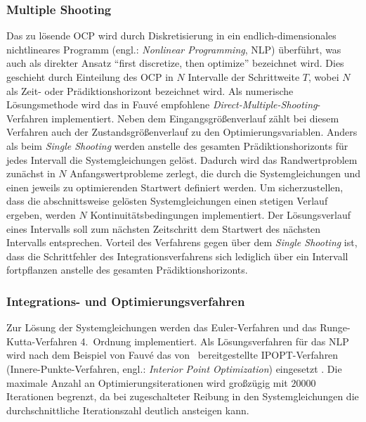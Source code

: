\subsubsection{Multiple Shooting}
Das zu lösende OCP wird durch Diskretisierung in ein endlich-dimensionales nichtlineares Programm (engl.: \textit{Nonlinear Programming}, NLP) überführt, was auch als direkter Ansatz \bzw "`first discretize, then optimize"' bezeichnet wird. Dies geschieht durch Einteilung des OCP in $N$ Intervalle der Schrittweite $T$, wobei $N$ als Zeit- oder Prädiktionshorizont bezeichnet wird. Als numerische Lösungsmethode wird das in Fauvé \cite{fauve} empfohlene \textit{Direct-Multiple-Shooting}-Verfahren implementiert. Neben dem Eingangsgrößenverlauf zählt bei diesem Verfahren auch der Zustandsgrößenverlauf zu den Optimierungsvariablen. Anders als beim \textit{Single Shooting} werden anstelle des gesamten Prädiktionshorizonts für jedes Intervall die Systemgleichungen gelöst. Dadurch wird das Randwertproblem zunächst in $N$ Anfangswertprobleme zerlegt, die durch die Systemgleichungen und einen jeweils zu optimierenden Startwert definiert werden. Um sicherzustellen, dass die abschnittsweise gelösten Systemgleichungen einen stetigen Verlauf ergeben, werden $N$ Kontinuitätsbedingungen implementiert. Der Lösungsverlauf eines Intervalls soll zum nächsten Zeitschritt dem Startwert des nächsten Intervalls entsprechen. Vorteil des Verfahrens gegen über dem \textit{Single Shooting} ist, dass die Schrittfehler des Integrationsverfahrens sich lediglich über ein Intervall fortpflanzen anstelle des gesamten Prädiktionshorizonts. \cite{Diehl2006}

\subsubsection{Integrations- und Optimierungsverfahren}
Zur Lösung der Systemgleichungen werden das Euler-Verfahren und das Runge-Kutta-Verfahren 4.~Ordnung implementiert. Als Lösungsverfahren für das NLP wird nach dem Beispiel von Fauvé \cite{fauve} das von \casadi\ bereitgestellte IPOPT-Verfahren (Innere-Punkte-Verfahren, engl.: \textit{Interior Point Optimization}) eingesetzt \cite{ipopt}. Die maximale Anzahl an Optimierungsiterationen wird großzügig mit $20000$ Iterationen begrenzt, da bei zugeschalteter Reibung in den Systemgleichungen die durchschnittliche Iterationszahl deutlich ansteigen kann.

